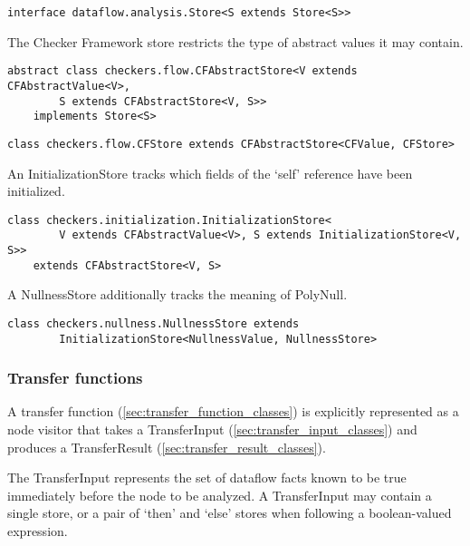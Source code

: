     \begin{verbatim}interface dataflow.analysis.Store<S extends Store<S>>\end{verbatim}

    The Checker Framework store restricts the type of abstract values it may contain.

    \begin{verbatim}abstract class checkers.flow.CFAbstractStore<V extends CFAbstractValue<V>,
        S extends CFAbstractStore<V, S>>
    implements Store<S>\end{verbatim}
    
    \begin{verbatim}class checkers.flow.CFStore extends CFAbstractStore<CFValue, CFStore>\end{verbatim}
    
    An InitializationStore tracks which fields of the `self' reference have been initialized.
    
    \begin{verbatim}class checkers.initialization.InitializationStore<
        V extends CFAbstractValue<V>, S extends InitializationStore<V, S>>
    extends CFAbstractStore<V, S>\end{verbatim}
    
    A NullnessStore additionally tracks the meaning of PolyNull.
    
    \begin{verbatim}class checkers.nullness.NullnessStore extends
        InitializationStore<NullnessValue, NullnessStore>\end{verbatim}


\subsubsection{Transfer functions}
\label{sec:transfer_functions}

    A transfer function (\autoref{sec:transfer_function_classes}) is
    explicitly represented as a node visitor that takes a TransferInput
    (\autoref{sec:transfer_input_classes}) and produces a TransferResult
    (\autoref{sec:transfer_result_classes}).

\label{sec:transfer_input_classes}

The TransferInput represents the set of dataflow facts known to be true immediately before the node to be analyzed.  A TransferInput may contain a single store, or a pair of `then' and `else' stores when following a boolean-valued expression.

